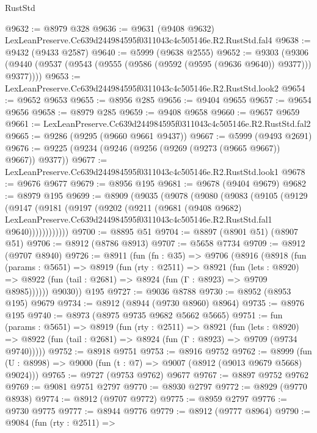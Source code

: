 \begin{lexlean}{RustStd}
\begin{coremodule}
@9632 := @8979 @328
@9636 := @9631 (@9408 @9632) LexLeanPreserve.Cc639d244984595f0311043c4c505146e.R2.RustStd.fal4
@9638 := @9432 (@9433 @2587)
@9640 := @5999 (@9638 @2555)
@9652 := @9303
    (@9306 (@9440 (@9537 (@9543 (@9555 (@9586 (@9592 (@9595 (@9636 @9640)) @9377))) @9377))))
@9653 := LexLeanPreserve.Cc639d244984595f0311043c4c505146e.R2.RustStd.look2
@9654 := @9652 @9653
@9655 := @8956 @285
@9656 := @9404 @9655
@9657 := @9654 @9656
@9658 := @8979 @285
@9659 := @9408 @9658
@9660 := @9657 @9659
@9661 := LexLeanPreserve.Cc639d244984595f0311043c4c505146e.R2.RustStd.fal2
@9665 := @9286 (@9295 (@9660 @9661 @9437))
@9667 := @5999 (@9493 @2691)
@9676 := @9225 (@9234 (@9246 (@9256 (@9269 (@9273 (@9665 @9667)) @9667)) @9377))
@9677 := LexLeanPreserve.Cc639d244984595f0311043c4c505146e.R2.RustStd.look1
@9678 := @9676 @9677
@9679 := @8956 @195
@9681 := @9678 (@9404 @9679)
@9682 := @8979 @195
@9699 := @8909
    (@9035
      (@9078
        (@9080
          (@9083
            (@9105
              (@9129
                (@9147
                  (@9181
                    (@9197
                      (@9202
                        (@9211
                          (@9681
                            (@9408 @9682)
                            LexLeanPreserve.Cc639d244984595f0311043c4c505146e.R2.RustStd.fal1
                            @9640))))))))))))
@9700 := @8895 @51
@9704 := @8897 (@8901 @51) (@8907 @51)
@9706 := @8912 (@8786 @8913)
@9707 := @5658 @7734
@9709 := @8912 (@9707 @8940)
@9726 := @8911
    (fun (fn : @35) =>
    @9706
      (@8916
        (@8918
          (fun (params : @5651) =>
          @8919
            (fun (rty : @2511) =>
            @8921
              (fun (lets : @8920) =>
              @8922 (fun (tail : @2681) => @8924 (fun (Γ : @8923) => @9709 @8985))))))
        @9030))
    @195
@9727 := @9036 @8788
@9730 := @8952 (@8953 @195) @9679
@9734 := @8912 (@8944 (@9730 @8960) @8964)
@9735 := @8976 @195
@9740 := @8973 (@8975 @9735 @9682 @5662 @5665)
@9751 := fun (params : @5651) =>
  @8919
    (fun (rty : @2511) =>
    @8921
      (fun (lets : @8920) =>
      @8922 (fun (tail : @2681) => @8924 (fun (Γ : @8923) => @9709 (@9734 @9740)))))
@9752 := @8918 @9751
@9753 := @8916 @9752
@9762 := @8999 (fun (U : @8998) => @9000 (fun (t : @7) => @9007 (@8912 (@9013 @9679 @5668) @9024)))
@9765 := @9727 (@9753 @9762) @9677
@9767 := @8897 @9752 @9762
@9769 := @9081 @9751 @2797
@9770 := @8930 @2797
@9772 := @8929 (@9770 @8938)
@9774 := @8912 (@9707 @9772)
@9775 := @8959 @2797
@9776 := @9730 @9775
@9777 := @8944 @9776
@9779 := @8912 (@9777 @8964)
@9790 := @9084
    (fun (rty : @2511) =>

\end{coremodule}
\end{lexlean}
